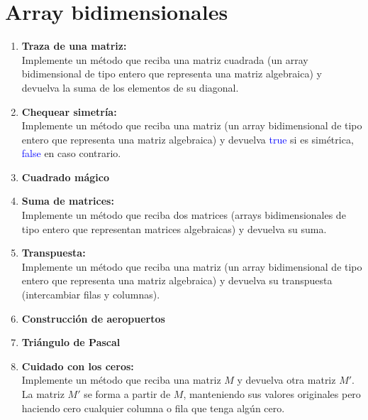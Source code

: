 \section{Array bidimensionales}
\begin{enumerate}
    \item \textbf{Traza de una matriz:}\\
    Implemente un método que reciba una matriz cuadrada (un array bidimensional de tipo entero que representa una matriz algebraica) y devuelva la suma de los elementos de su diagonal.

    \item \textbf{Chequear simetría:}\\
    Implemente un método que reciba una matriz (un array bidimensional de tipo entero que representa una matriz algebraica) y devuelva \textcolor{blue}{true} si es simétrica, \textcolor{blue}{false} en caso contrario.

    \item \textbf{Cuadrado mágico}\\
    

    \item \textbf{Suma de matrices:}\\
    Implemente un método que reciba dos matrices (arrays bidimensionales de tipo entero que representan matrices algebraicas) y devuelva su suma.

    \item \textbf{Transpuesta:}\\
    Implemente un método que reciba una matriz (un array bidimensional de tipo entero que representa una matriz algebraica) y devuelva su transpuesta (intercambiar filas y columnas).

    \item \textbf{Construcción de aeropuertos}\\
    

    \item \textbf{Triángulo de Pascal}\\
    

    \item \textbf{Cuidado con los ceros:}\\
    Implemente un método que reciba una matriz \(M\) y devuelva otra matriz \(M'\). La matriz \(M'\) se forma a partir de \(M\), manteniendo sus valores originales pero haciendo cero cualquier columna o fila que tenga algún cero.


\end{enumerate}
